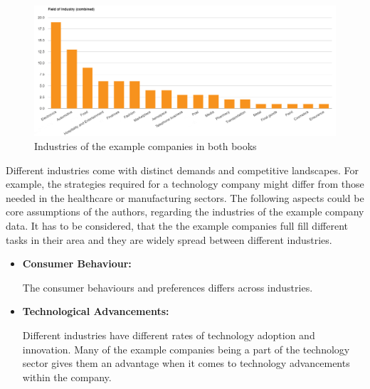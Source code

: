 \documentclass[a4]{scrartcl}
\begin{document}
\begin{figure}[h!]
	\centering
	\includegraphics[width=1\textwidth]{images/combi_graph_i.png}
	\caption{Industries of the example companies in both books \cite{digitalmatrix, leadingdigital}}
	\label{fig:C_graph_i}
\end{figure}



Different industries come with distinct demands and competitive landscapes. For example, the strategies required for a technology company might differ from those needed in the healthcare or manufacturing sectors. The following aspects could be core assumptions of the authors, regarding the industries of the example company data. It has to be considered, that the the example companies full fill different tasks in their area and they are widely spread between different industries.

\begin{itemize}
	
		
	\item \textbf{Consumer Behaviour:}
	
	The consumer behaviours and preferences differs across industries. \cite{wiwi}
	
	
	\item \textbf{Technological Advancements:}
	
	 Different industries have different rates of technology adoption and innovation. Many of the example companies being a part of the technology sector gives them an advantage when it comes to technology advancements within the company. \cite{wiwi}
	
	
	
\end{itemize}











\end{document}
